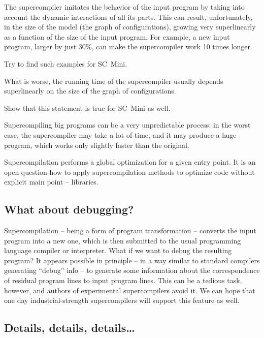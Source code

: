 The supercompiler imitates the behavior of the input program by taking into
account the dynamic interactions of all its parts.
This can result, unfortunately, in the size of the model (the graph of configurations),
growing very superlinearly as a function of the size of the input program.
For example, a new input program, larger by just 30\%, can make the
supercompiler work 10 times longer.

\begin{exercise}
Try to find such examples for SC~Mini.
\end{exercise}

What is worse, the running time of the supercompiler usually 
depends superlinearly on the size of the graph of configurations.

\begin{exercise}
Show that this statement is true for SC~Mini as well.
\end{exercise}

Supercompiling big programs can be a very unpredictable process:
in the worst case, the supercompiler may take a lot of time, and it may
produce a huge program, which works only slightly faster than the original.

Supercompilation performs a global optimization for a given entry point.
It is an open question how to apply supercompilation methods to optimize
code without explicit main point -- libraries.

\subsection{What about debugging?}

Supercompilation -- being a form of program transformation -- converts the
input program into a new one, which is then submitted to the usual
programming language compiler or interpreter.
What if we want to debug the resulting program?
It appears possible in principle -- in a way similar to
standard compilers generating ``debug'' info --
to generate some information about the correspondence of
residual program lines to input program lines.
This can be a tedious task, however, and
authors of experimental supercompilers avoid it.
We can hope that one day industrial-strength supercompilers
will support this feature as well.

\subsection{Details, details, details\ldots}

